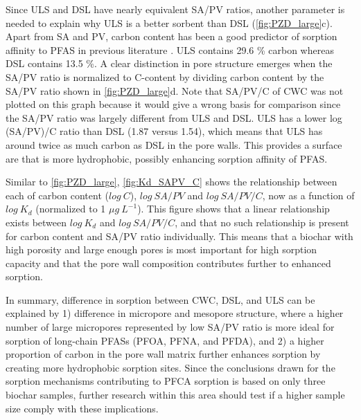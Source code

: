 Since ULS and DSL have nearly equivalent SA/PV ratios, another parameter is needed to explain why ULS is a better sorbent than DSL (\cref{fig:PZD_large}c). Apart from SA and PV, carbon content has been a good predictor of sorption affinity to PFAS in previous literature \citep{Hale2016,Cornelissen2005}. ULS contains 29.6 \% carbon whereas DSL contains 13.5 \%. A clear distinction in pore structure emerges when the SA/PV ratio is normalized to C-content by dividing carbon content by the SA/PV ratio shown in \cref{fig:PZD_large}d. Note that SA/PV/C of CWC was not plotted on this graph because it would give a wrong basis for comparison since the SA/PV ratio was largely different from ULS and DSL. ULS has a lower log (SA/PV)/C ratio than DSL (1.87 versus 1.54), which means that ULS has around twice as much carbon as DSL in the pore walls. This provides a surface are that is more hydrophobic, possibly enhancing sorption affinity of PFAS. 

Similar to \cref{fig:PZD_large}, \cref{fig:Kd_SAPV_C} shows the relationship between each of carbon content ($log~C$), $log~SA/PV$ and $log~SA/PV/C$, now as a function of $log~K_d$ (normalized to 1 $\mu g~L^{-1}$). This figure shows that a linear relationship exists between $log~K_d$ and $log~SA/PV/C$, and that no such relationship is present for carbon content and SA/PV ratio individually. This means that a biochar with high porosity and large enough pores is most important for high sorption capacity and that the pore wall composition contributes further to enhanced sorption. 

In summary, difference in sorption between CWC, DSL, and ULS can be explained by 1) difference in micropore and mesopore structure, where a higher number of large micropores represented by low SA/PV ratio is more ideal for sorption of long-chain PFASs (PFOA, PFNA, and PFDA), and 2) a higher proportion of carbon in the pore wall matrix further enhances sorption by creating more hydrophobic sorption sites. Since the conclusions drawn for the sorption mechanisms contributing to PFCA sorption is based on only three biochar samples, further research within this area should test if a higher sample size comply with these implications. 


